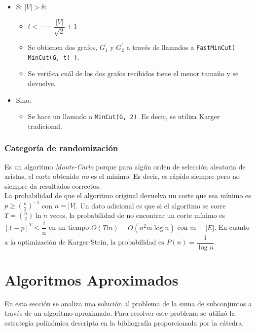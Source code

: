 \documentclass[a4paper, 10pt]{article}
\def\code#1{\texttt{#1}}
\newcommand\tab[1][0.5cm]{\hspace*{#1}}
\begin{document}
                    \begin{itemize}
                        \item Si $|V| > 8$:
                        \begin{itemize}
                            \item $t <-- \dfrac{|V|}{\sqrt{2}} + 1$
                            \item Se obtienen dos grafos, $G_{1}^{'}$ y $G_{2}^{'}$ a través de llamados a
                            \code{FastMinCut( MinCut(G, t) )}.
                            \item Se verifica cuál de los dos grafos recibidos tiene el menor tamaño y se devuelve.
                        \end{itemize}
                        \item Sino:
                        \begin{itemize}
                            \item Se hace un llamado a \code{MinCut(G, 2)}. Es decir, se utiliza Karger tradicional.
                        \end{itemize}
                    \end{itemize}
            \subsubsection{Categoría de randomización}
                    Es un algoritmo \emph{Monte-Carlo} porque para algún orden de selección aleatoria
                de aristas, el corte obtenido \emph{no} es el mínimo. Es decir, es rápido siempre pero no siempre
                da resultados correctos. \\
                \tab La probabilidad de que el algoritmo original devuelva un corte que sea mínimo es $p \geqslant \binom{n}{2}^{-1}$
                con $n = |V|$. Un dato adicional es que si el algoritmo se corre $T = \binom{n}{2}\ln{n}$ veces,
                la probabilidad de no encontrar un corte mínimo es $[1-p]^T \leqslant \dfrac{1}{n}$ en un tiempo
                $O(Tm) = O(n^2m\log{n})$ con $m = |E|$.
                \tab En cuanto a la optimización de Karger-Stein, la probabilidad es $P(n) = \dfrac{1}{\log{n}}$.
    \newpage

    \section{Algoritmos Aproximados}
        \tab En esta sección se analiza una solución al problema de la suma de subconjuntos
        a través de un algoritmo aproximado. Para resolver este problema se utilizó la
        estrategia polinómica descripta en la bibliografía proporcionada por la cátedra.
\end{document}
